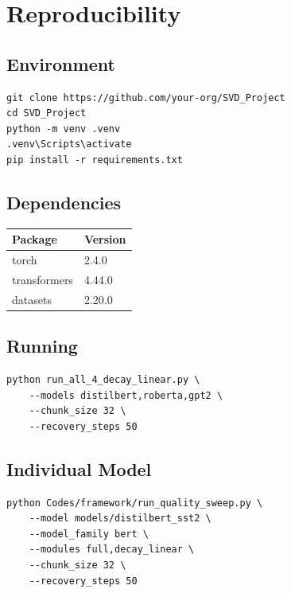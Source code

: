 \section{Reproducibility}

\subsection{Environment}

\begin{lstlisting}
git clone https://github.com/your-org/SVD_Project
cd SVD_Project
python -m venv .venv
.venv\Scripts\activate
pip install -r requirements.txt
\end{lstlisting}

\subsection{Dependencies}

\begin{table}[H]
\centering
\small
\begin{tabular}{ll}
\toprule
\textbf{Package} & \textbf{Version} \\
\midrule
torch & 2.4.0 \\
transformers & 4.44.0 \\
datasets & 2.20.0 \\
\bottomrule
\end{tabular}
\end{table}

\subsection{Running}

\begin{lstlisting}
python run_all_4_decay_linear.py \
    --models distilbert,roberta,gpt2 \
    --chunk_size 32 \
    --recovery_steps 50
\end{lstlisting}

\subsection{Individual Model}

\begin{lstlisting}
python Codes/framework/run_quality_sweep.py \
    --model models/distilbert_sst2 \
    --model_family bert \
    --modules full,decay_linear \
    --chunk_size 32 \
    --recovery_steps 50
\end{lstlisting}


